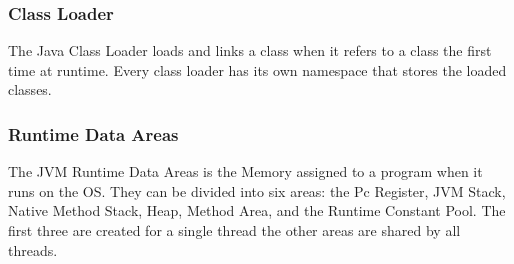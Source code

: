 \subsubsection{Class Loader}
The Java Class Loader loads and links a class when it refers to a class the first time at runtime. Every class loader has its own namespace that stores the loaded classes.\cite{javaJVM} 

\subsubsection{Runtime Data Areas}
The JVM Runtime Data Areas is the Memory assigned to a program when it runs on the OS. They can be divided into six areas: the Pc Register, JVM Stack, Native Method Stack, Heap, Method Area, and the Runtime Constant Pool. The first three are created for a single thread the other areas are shared by all threads.  


